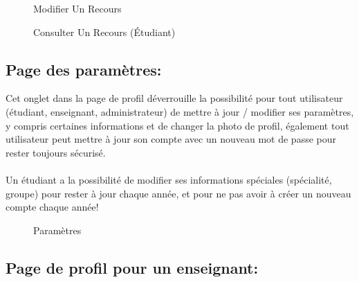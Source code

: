 \documentclass[12pt]{report}
\begin{document}
\newpage

\begin{figure}[H]
\centering
  \vspace*{-0.3in}
  \hspace*{-0.1in}
\caption{Modifier Un Recours}
\end{figure}

\begin{figure}[H]
\centering
  \vspace*{0.05in}
  \hspace*{-0.1in}
  \caption{Consulter Un Recours (Étudiant)}
  \vspace*{-0.1in}
\end{figure}

\newpage

\subsection{Page des paramètres:}
\vspace{0.2in}

Cet onglet dans la page de profil déverrouille la possibilité pour tout utilisateur (étudiant, enseignant, administrateur) de mettre à jour / modifier ses paramètres, y compris certaines informations et de changer la photo de profil, également tout utilisateur peut mettre à jour son compte avec un nouveau mot de passe pour rester toujours sécurisé.
\\\\
Un étudiant a la possibilité de modifier ses informations spéciales (spécialité, groupe) pour rester à jour chaque année, et pour ne pas avoir à créer un nouveau compte chaque année!

\vspace{0.4in}

\begin{figure}[h]
\centering
  \hspace*{-0.33in}
\caption{Paramètres}
\end{figure}

\newpage

\vspace*{-0.6in}
\subsection{Page de profil pour un enseignant:}
\end{document}
